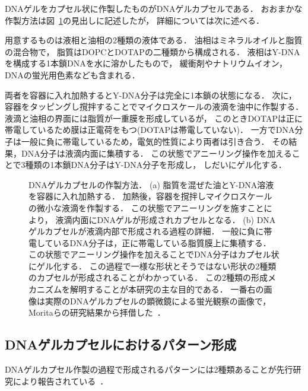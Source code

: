 DNAゲルをカプセル状に作製したものがDNAゲルカプセルである．
おおまかな作製方法は図~\ref{fig:capsule}の見出しに記述したが，
詳細については次に述べる．

用意するものは液相と油相の2種類の液体である．
油相はミネラルオイルと脂質の混合物で，
脂質はDOPCとDOTAPの二種類から構成される．
液相はY-DNAを構成する1本鎖DNAを水に溶かしたもので，
緩衝剤やナトリウムイオン，DNAの蛍光用色素なども含まれる．

両者を容器に入れ加熱するとY-DNA分子は完全に1本鎖の状態になる．
次に，容器をタッピングし撹拌することでマイクロスケールの液滴を油中に作製する．
液滴と油相の界面には脂質が一重膜を形成しているが，
このときDOTAPは正に帯電しているため膜は正電荷をもつ(DOTAPは帯電していない)．
一方でDNA分子は一般に負に帯電しているため，電気的性質により両者は引き合う．
その結果，DNA分子は液滴内面に集積する．
この状態でアニーリング操作を加えることで3種類の1本鎖DNA分子はY-DNA分子を形成し，
しだいにゲル化する．

\begin{figure}
\centering

\caption{DNAゲルカプセルの作製方法．
    (a) 脂質を混ぜた油とY-DNA溶液を容器に入れ加熱する．
        加熱後，容器を撹拌しマイクロスケールの微小な液滴を作製する．
        この状態でアニーリングを施すことにより，
        液滴内面にDNAゲルが形成されカプセルとなる．
    (b) DNAゲルカプセルが液滴内部で形成される過程の詳細．
        一般に負に帯電しているDNA分子は，正に帯電している脂質膜上に集積する．
        この状態でアニーリング操作を加えることでDNA分子はカプセル状にゲル化する．
        この過程で一様な形状とそうではない形状の2種類のカプセルが形成されることがわかっている．
        この2種類の形成メカニズムを解明することが本研究の主な目的である．
        一番右の画像は実際のDNAゲルカプセルの顕微鏡による蛍光観察の画像で，
        Moritaらの研究結果から拝借した~\cite{moritasan}．
}

\label{fig:capsule}
\end{figure}


\subsection{DNAゲルカプセルにおけるパターン形成}

DNAゲルカプセル作製の過程で形成されるパターンには2種類あることが先行研究により報告されている~\cite{morita2017formation}．

